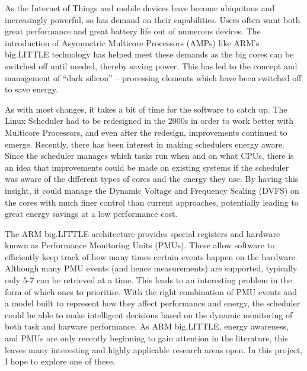 As the Internet of Things and mobile devices have become ubiquitous and 
increasingly powerful, so has demand on their capabilities. Users often want 
both great performance and great battery life out of numerous devices. The 
introduction of Asymmetric Multicore Processors (AMPs) like ARM's big.LITTLE 
technology has helped meet these demands as the big cores can be switched off 
until needed, thereby saving power. This has led to the concept and management  
of ``dark silicon'' -- processing elements which have been switched off to save 
energy.

As with most changes, it takes a bit of time for the software to catch up. The 
Linux Scheduler had to be redesigned in the 2000s in order to work better with 
Multicore Processors, and even after the redesign, improvements continued to 
emerge. Recently, there has been interest in making schedulers energy aware. 
Since the scheduler manages which tasks run when and on what CPUs, there is an 
idea that improvements could be made on existing systems if the scheduler was 
aware of the different types of cores and the energy they use. By having this 
insight, it could manage the Dynamic Voltage and Frequency Scaling (DVFS) on 
the cores with much finer control than current approaches, potentially leading 
to great energy savings at a low performance cost.

The ARM big.LITTLE architecture provides special registers and hardware known 
as Performance Monitoring Units (PMUs). These allow software to efficiently 
keep track of how many times certain events happen on the hardware. Although 
many PMU events (and hence measurements) are supported, typically only 5-7 can 
be retrieved at a time. This leads to an interesting problem in the form of 
which ones to prioritise. With the right combination of PMU events and a model 
built to represent how they affect performance and energy, the scheduler could 
be able to make intelligent decisions based on the dynamic monitoring of both 
task and harware performance. As ARM big.LITTLE, energy awareness, and PMUs are 
only recently beginning to gain attention in the literature, this leaves many 
interesting and highly applicable research areas open. In this project, I hope 
to explore one of these.
